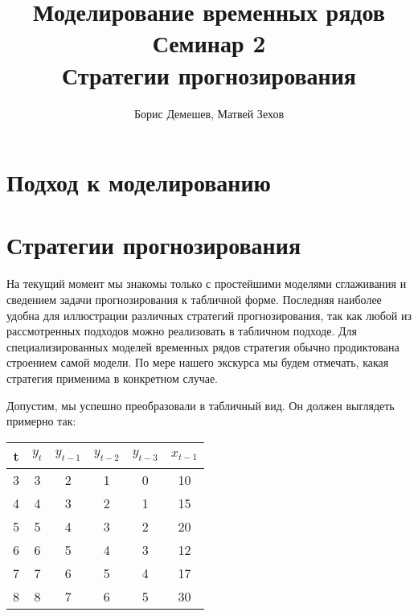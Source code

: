 \documentclass[12pt,fleqn]{article}
\begin{document}
\title{Моделирование временных рядов\\Семинар 2\\Стратегии прогнозирования}
\author{Борис Демешев, Матвей Зехов}
\date{}
\maketitle

\section{Подход к моделированию}

\section{Стратегии прогнозирования}

На текущий момент мы знакомы только с простейшими моделями сглаживания и сведением задачи прогнозирования к табличной форме. Последняя наиболее удобна для иллюстрации различных стратегий прогнозирования, так как любой из рассмотренных подходов можно реализовать в табличном подходе. Для специализированных моделей временных рядов стратегия обычно продиктована строением самой модели. По мере нашего экскурса мы будем отмечать, какая стратегия применима в конкретном случае. 

Допустим, мы успешно преобразовали в табличный вид. Он должен выглядеть примерно так:

\begin{table}[!h]
	\centering
	\begin{tabular}{|c|c|cccc|}
		\hline
		t & $y_t$ & $y_{t-1}$ & $y_{t-2}$ & $y_{t-3}$ & $x_{t-1}$ \\ \hline
		3 & 3     & 2         & 1         & 0         & 10        \\
		4 & 4     & 3         & 2         & 1         & 15        \\
		5 & 5     & 4         & 3         & 2         & 20        \\
		6 & 6     & 5         & 4         & 3         & 12        \\
		7 & 7     & 6         & 5         & 4         & 17        \\
		8 & 8     & 7         & 6         & 5         & 30        \\ \hline
	\end{tabular}
\end{table}
\end{document}
